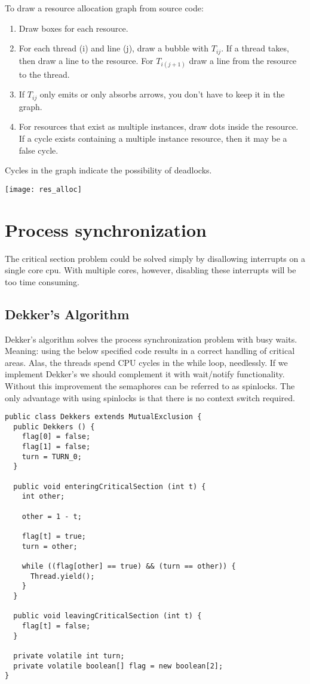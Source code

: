\documentclass[a4paper]{article}
\begin{document}
To draw a resource allocation graph from source code:
\begin{enumerate}
  \item Draw boxes for each resource.
  \item For each thread (i) and line (j), draw a bubble with $T_{ij}$. If a thread
        takes, then draw a line to the resource. For $T_{i(j+1)}$ draw a line from the
        resource to the thread.
  \item If $T_{ij}$ only emits or only absorbs arrows, you don't have to keep
        it in the graph.
  \item For resources that exist as multiple instances, draw dots inside the resource.
        If a cycle exists containing a multiple instance resource, then it may be a
        false cycle.
\end{enumerate}

Cycles in the graph indicate the possibility of deadlocks.
\begin{center}
  \texttt{[image: res\_alloc]}
\end{center}

\section{Process synchronization}

The critical section problem could be solved simply by disallowing interrupts
on a single core cpu. With multiple cores, however, disabling these interrupts
will be too time consuming.

\subsection{Dekker's Algorithm}
Dekker's algorithm solves the process synchronization problem with busy waits.
Meaning: using the below specified code results in a correct handling of
critical areas. Alas, the threads spend CPU cycles in the while loop, needlessly.
If we implement Dekker's we should complement it with wait/notify functionality.
Without this improvement the semaphores can be referred to as spinlocks.
The only advantage with using spinlocks is that there is no context switch
required.

\begin{lstlisting}[label=dekkers,caption=Dekker's Algorithm]
public class Dekkers extends MutualExclusion {
  public Dekkers () {
    flag[0] = false;
    flag[1] = false;
    turn = TURN_0;
  }

  public void enteringCriticalSection (int t) {
    int other;

    other = 1 - t;

    flag[t] = true;
    turn = other;

    while ((flag[other] == true) && (turn == other)) {
      Thread.yield();
    }
  }

  public void leavingCriticalSection (int t) {
    flag[t] = false;
  }

  private volatile int turn;
  private volatile boolean[] flag = new boolean[2];
}
\end{lstlisting}
\end{document}
